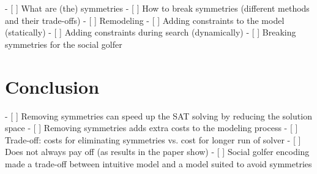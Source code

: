 \documentclass[a4paper]{scrartcl}
\begin{document}
- [ ] What are (the) symmetries
- [ ] How to break symmetries (different methods and their trade-offs)
    - [ ] Remodeling
    - [ ] Adding constraints to the model (statically)
    - [ ] Adding constraints during search (dynamically)
- [ ] Breaking symmetries for the social golfer

\section{Conclusion}

- [ ] Removing symmetries can speed up the SAT solving by reducing the
      solution space
- [ ] Removing symmetries adds extra costs to the modeling process
    - [ ] Trade-off: costs for eliminating symmetries vs. cost for
          longer run of solver
    - [ ] Does not always pay off (as results in the paper show)
- [ ] Social golfer encoding made a trade-off between intuitive model
      and a model suited to avoid symmetries
\end{document}
